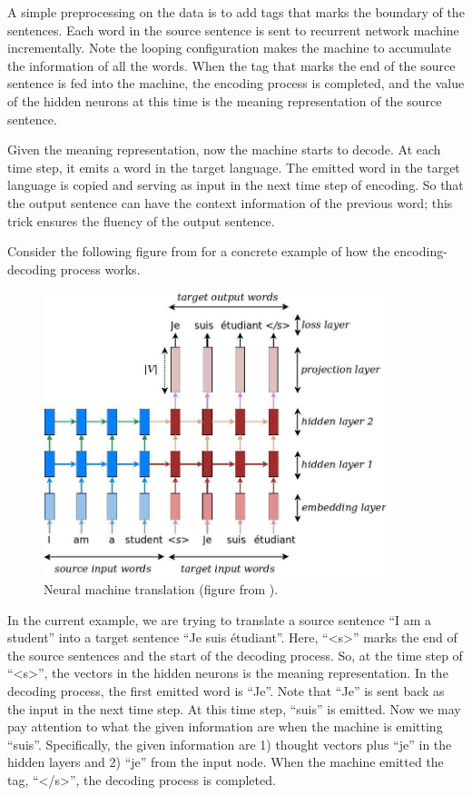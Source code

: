 \documentclass[final]{ua-thesis}
\numberwithin{equation}{section}
\begin{document}
A simple preprocessing on the data is to add tags that marks the boundary of the sentences. Each word in the source sentence is sent to recurrent network machine incrementally. 
Note the looping configuration makes the machine to accumulate the information of all the words. When the tag that marks the end of the source sentence is fed into the machine, the encoding process is completed, and the value of the hidden neurons at this time is the meaning representation of the source sentence.  

Given the meaning representation, now the machine starts to decode. At each time step, it emits a word in the target language. The emitted word in the target language is copied and serving as input in the next time step of encoding. So that the output sentence can have the context information of the previous word; this trick ensures the fluency of the output sentence. 

Consider the following figure from \citet{luong17GitHub} for a concrete example of how the encoding-decoding process works.  

\begin{figure}[h]
\caption{Neural machine translation (figure from \citet{luong17GitHub}).}
\centering
\includegraphics[width=0.9\textwidth]{seq2seq.jpg}
\end{figure} 

In the current example, we are trying to translate a source sentence ``I am a student'' into a target sentence ``Je suis \'{e}tudiant''. Here, ``<s>'' marks the end of the source sentences and the start of the decoding process. 
So, at the time step of  ``<s>'', the vectors in the hidden neurons is the meaning representation. In the decoding process, the first emitted word is ``Je''. Note that ``Je'' is sent back as the input in the next time step. At this time step, ``suis'' is emitted. Now we may pay attention to what the given information are when the machine is emitting ``suis''. Specifically, the given information are 1) thought vectors plus ``je'' in the hidden layers and 2) ``je'' from the input node. When the machine emitted the tag, ``</s>'', the decoding process is completed. 
\end{document}
